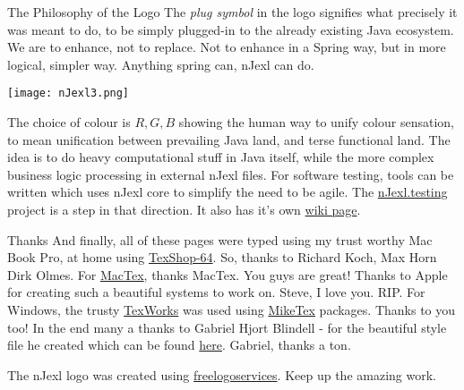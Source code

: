 \begin{subsection}{The Philosophy of the Logo}
The \emph{plug symbol} in the logo signifies what precisely it was meant to do, 
to be simply plugged-in to the already existing Java ecosystem.  
We are to enhance, not to replace. Not to enhance in a Spring way, but in more logical, 
simpler way. Anything spring can, nJexl can do.

\begin{minipage}{0.8\textwidth}
    \centering
    \texttt{[image: nJexl3.png]}
\end{minipage}

The choice of colour is $R,G,B$ showing the human way to unify colour sensation, to mean unification between 
prevailing Java land, and terse functional land.
The idea is to do heavy computational stuff in Java itself, while the more complex business logic processing
in external nJexl files. For software testing, tools can be written which uses nJexl core to simplify 
the need to be agile. The \href{https://github.com/nmondal/njexl/tree/master/testing}{nJexl.testing} project is a step in that direction.
It also has it's own \href{https://github.com/nmondal/njexl/wiki/12-Using-Test-Framework}{wiki page}.

\end{subsection}


\begin{subsection}{Thanks}
And finally, all of these pages were typed using my trust worthy Mac Book Pro, at home using \href{http://pages.uoregon.edu/koch/texshop}{TexShop-64}.
So, thanks to Richard Koch, Max Horn Dirk Olmes. For \href{http://tug.org/mactex/}{MacTex}, thanks MacTex. You guys are great!
Thanks to Apple for creating such a beautiful systems to work on. Steve, I love you. RIP.
For Windows, the trusty \href{http://www.tug.org/texworks}{TexWorks} was used using \href{http://miktex.org}{MikeTex} packages. Thanks to you too!
In the end many a thanks to Gabriel Hjort Blindell - for the beautiful style file he created which can be found 
\href{http://gabriel.hjort.blindell.se/publications/documents/thesis-template.tar.gz}{here}. Gabriel, thanks a ton.

The nJexl logo was created using \href{http://www.freelogoservices.com/}{freelogoservices}. 
Keep up the amazing work.

\end{subsection}